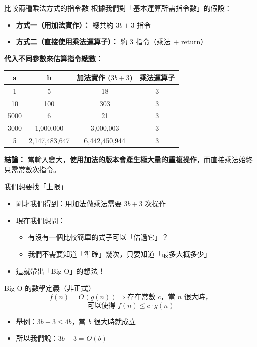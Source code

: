 \documentclass{beamer}
\begin{document}
\begin{frame}{比較兩種乘法方式的指令數}
根據我們對「基本運算所需指令數」的假設：

\begin{itemize}
    \item \textbf{方式一（用加法實作）：} 總共約 $3b + 3$ 指令
    \item \textbf{方式二（直接使用乘法運算子）：} 約 3 指令（乘法 + return）
\end{itemize}

\vspace{1em}
\textbf{代入不同參數來估算指令總數：}

\begin{center}
\begin{tabular}{|c|c|c|c|}
\hline
\textbf{a} & \textbf{b} & \textbf{加法實作 ($3b + 3$)} & \textbf{乘法運算子} \\
\hline
1 & 5 & 18 & 3 \\
10 & 100 & 303 & 3 \\
5000 & 6 & 21 & 3 \\
3000 & 1,000,000 & 3,000,003 & 3 \\
5 & 2,147,483,647 & 6,442,450,944 & 3 \\
\hline
\end{tabular}
\end{center}

\vspace{0.5em}
\textbf{結論：} 當輸入變大，\textbf{使用加法的版本會產生極大量的重複操作}，而直接乘法始終只需常數次指令。
\end{frame}

\begin{frame}{我們想要找「上限」}
\begin{itemize}
    \item 剛才我們得到：用加法做乘法需要 $3b + 3$ 次操作
    \item 現在我們想問：
    \begin{itemize}
        \item 有沒有一個比較簡單的式子可以「估過它」？
        \item 我們不需要知道「準確」幾次，只要知道「最多大概多少」
    \end{itemize}
    \item 這就帶出「Big O」的想法！
\end{itemize}

\vspace{1em}
\begin{block}{Big O 的數學定義（非正式）}
\[
f(n) = O(g(n)) \Longrightarrow \text{存在常數 } c\text{，當 } n \text{ 很大時，}
\]
\[
\text{可以使得 } f(n) \leq c \cdot g(n)
\]
\end{block}

\vspace{0.5em}
\begin{itemize}
    \item 舉例：$3b + 3 \leq 4b$，當 $b$ 很大時就成立
    \item 所以我們說：$3b + 3 = O(b)$
\end{itemize}
\end{frame}
\end{document}
